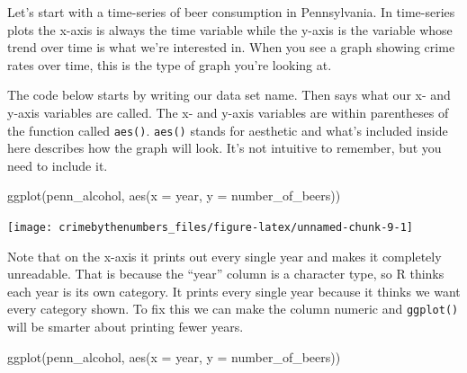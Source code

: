 \documentclass[
  12pt,
]{book}
\newenvironment{Shaded}{\begin{snugshade}}{\end{snugshade}}
\newcommand{\AttributeTok}[1]{\textcolor[rgb]{0.61,0.61,0.61}{#1}}
\newcommand{\FunctionTok}[1]{\textcolor[rgb]{0,0,0}{#1}}
\newcommand{\NormalTok}[1]{#1}
\newcommand{\OtherTok}[1]{\textcolor[rgb]{0.37,0.37,0.37}{#1}}
\newcommand{\SpecialCharTok}[1]{\textcolor[rgb]{0,0,0}{#1}}
\begin{document}
Let's start with a time-series of beer consumption in Pennsylvania. In time-series plots the x-axis is always the time variable while the y-axis is the variable whose trend over time is what we're interested in. When you see a graph showing crime rates over time, this is the type of graph you're looking at.

The code below starts by writing our data set name. Then says what our x- and y-axis variables are called. The x- and y-axis variables are within parentheses of the function called \texttt{aes()}. \texttt{aes()} stands for aesthetic and what's included inside here describes how the graph will look. It's not intuitive to remember, but you need to include it.

\begin{Shaded}
\begin{Highlighting}[]
\FunctionTok{ggplot}\NormalTok{(penn\_alcohol, }\FunctionTok{aes}\NormalTok{(}\AttributeTok{x =}\NormalTok{ year,}
                         \AttributeTok{y =}\NormalTok{ number\_of\_beers))}
\end{Highlighting}
\end{Shaded}

\begin{center}\texttt{[image: crimebythenumbers\_files/figure-latex/unnamed-chunk-9-1]} \end{center}

Note that on the x-axis it prints out every single year and makes it completely unreadable. That is because the ``year'' column is a character type, so R thinks each year is its own category. It prints every single year because it thinks we want every category shown. To fix this we can make the column numeric and \texttt{ggplot()} will be smarter about printing fewer years.

\begin{Shaded}
\end{Shaded}

\begin{Shaded}
\begin{Highlighting}[]
\FunctionTok{ggplot}\NormalTok{(penn\_alcohol, }\FunctionTok{aes}\NormalTok{(}\AttributeTok{x =}\NormalTok{ year,}
                         \AttributeTok{y =}\NormalTok{ number\_of\_beers))}
\end{Highlighting}
\end{Shaded}
\end{document}

